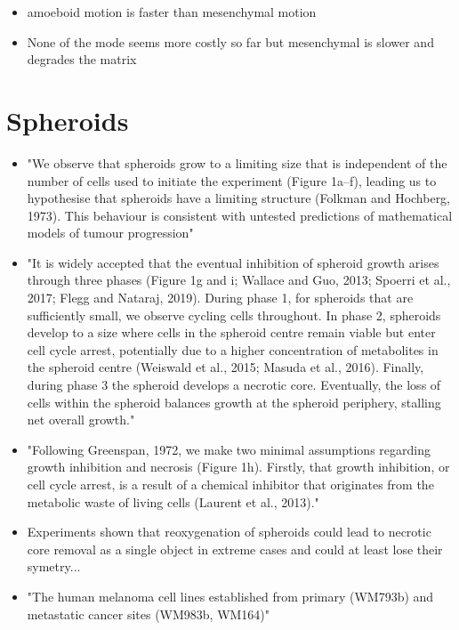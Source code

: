 \documentclass[11pt,a4paper]{article}
\begin{document}
\begin{itemize}
\item amoeboid motion is faster than mesenchymal motion \cite{Wu2021}
\item None of the mode seems more costly so far but mesenchymal is slower and degrades the matrix
\end{itemize}

\section{Spheroids}
\begin{itemize}
\item "We observe that spheroids grow to a limiting size that is independent of the number of cells used to initiate the experiment (Figure 1a–f), leading us to hypothesise that spheroids have a limiting structure (Folkman and Hochberg, 1973). This behaviour is consistent with untested predictions of mathematical models of tumour progression"\cite{Browning2021}

\item "It is widely accepted that the eventual inhibition of spheroid growth arises through three phases (Figure 1g and i; Wallace and Guo, 2013; Spoerri et al., 2017; Flegg and Nataraj, 2019). During phase 1, for spheroids that are sufficiently small, we observe cycling cells throughout. In phase 2, spheroids develop to a size where cells in the spheroid centre remain viable but enter cell cycle arrest, potentially due to a higher concentration of metabolites in the spheroid centre (Weiswald et al., 2015; Masuda et al., 2016). Finally, during phase 3 the spheroid develops a necrotic core. Eventually, the loss of cells within the spheroid balances growth at the spheroid periphery, stalling net overall growth."\cite{Browning2021}
\item "Following Greenspan, 1972, we make two minimal assumptions regarding growth inhibition and necrosis (Figure 1h). Firstly, that growth inhibition, or cell cycle arrest, is a result of a chemical inhibitor that originates from the metabolic waste of living cells (Laurent et al., 2013)."\cite{Browning2021}

\item Experiments shown that reoxygenation of spheroids could lead to necrotic core removal as a single object in extreme cases and could at least lose their symetry...\cite{Murphy2023}

\item "The human melanoma cell lines established from primary (WM793b) and metastatic cancer sites (WM983b, WM164)"\cite{Murphy2023}


\end{itemize}
\end{document}
